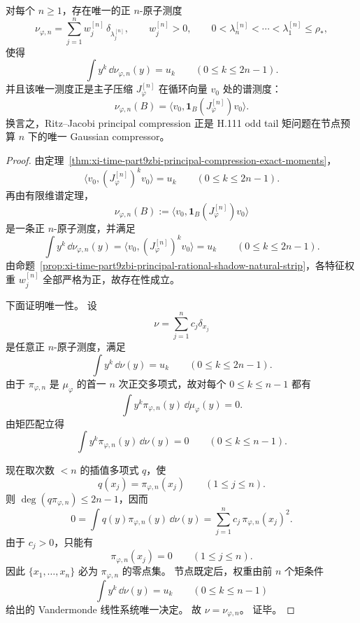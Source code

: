 \begin{theorem}\label{thm:xi-time-part9zbk-gaussian-compressor-uniqueness}
对每个 \(n\ge 1\)，存在唯一的正 \(n\)-原子测度
\[
\nu_{\varphi,n}
=
\sum_{j=1}^{n}w_j^{[n]}\,\delta_{\lambda_j^{[n]}},
\qquad
w_j^{[n]}>0,
\qquad
0<\lambda_n^{[n]}<\cdots<\lambda_1^{[n]}\le \rho_\ast,
\]
使得
\[
\int y^k\,\dd\nu_{\varphi,n}(y)=u_k
\qquad (0\le k\le 2n-1).
\]
并且该唯一测度正是主子压缩 \(J_\varphi^{[n]}\) 在循环向量 \(v_0\) 处的谱测度：
\[
\nu_{\varphi,n}(B)=\langle v_0,\mathbf 1_B(J_\varphi^{[n]})v_0\rangle.
\]
换言之，Ritz--Jacobi principal compression 正是 H.111 odd tail 矩问题在节点预算 \(n\) 下的唯一 Gaussian compressor。
\end{theorem}
\begin{proof}
由定理~\ref{thm:xi-time-part9zbi-principal-compression-exact-moments}，
\[
\langle v_0,(J_\varphi^{[n]})^k v_0\rangle=u_k
\qquad (0\le k\le 2n-1).
\]
再由有限维谱定理，
\[
\nu_{\varphi,n}(B):=\langle v_0,\mathbf 1_B(J_\varphi^{[n]})v_0\rangle
\]
是一条正 \(n\)-原子测度，并满足
\[
\int y^k\,\dd\nu_{\varphi,n}(y)
=
\langle v_0,(J_\varphi^{[n]})^k v_0\rangle
=
u_k
\qquad (0\le k\le 2n-1).
\]
由命题~\ref{prop:xi-time-part9zbi-principal-rational-shadow-natural-strip}，各特征权重 \(w_j^{[n]}\) 全部严格为正，故存在性成立。

下面证明唯一性。
设
\[
\nu=\sum_{j=1}^{n}c_j\delta_{x_j}
\]
是任意正 \(n\)-原子测度，满足
\[
\int y^k\,\dd\nu(y)=u_k
\qquad (0\le k\le 2n-1).
\]
由于 \(\pi_{\varphi,n}\) 是 \(\mu_\varphi\) 的首一 \(n\) 次正交多项式，故对每个 \(0\le k\le n-1\) 都有
\[
\int y^k\pi_{\varphi,n}(y)\,\dd\mu_\varphi(y)=0.
\]
由矩匹配立得
\[
\int y^k\pi_{\varphi,n}(y)\,\dd\nu(y)=0
\qquad (0\le k\le n-1).
\]

现在取次数 \(<n\) 的插值多项式 \(q\)，使
\[
q(x_j)=\pi_{\varphi,n}(x_j)
\qquad (1\le j\le n).
\]
则 \(\deg(q\pi_{\varphi,n})\le 2n-1\)，因而
\[
0=\int q(y)\pi_{\varphi,n}(y)\,\dd\nu(y)
=
\sum_{j=1}^{n}c_j\,\pi_{\varphi,n}(x_j)^2.
\]
由于 \(c_j>0\)，只能有
\[
\pi_{\varphi,n}(x_j)=0
\qquad (1\le j\le n).
\]
因此 \(\{x_1,\dots,x_n\}\) 必为 \(\pi_{\varphi,n}\) 的零点集。
节点既定后，权重由前 \(n\) 个矩条件
\[
\int y^k\,\dd\nu(y)=u_k
\qquad (0\le k\le n-1)
\]
给出的 Vandermonde 线性系统唯一决定。
故 \(\nu=\nu_{\varphi,n}\)。
证毕。
\end{proof}

